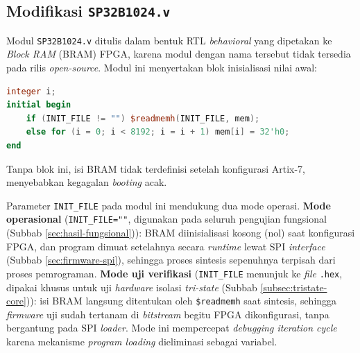 

\subsection{Modifikasi \texttt{SP32B1024.v}}
\label{subsec:sp32b1024}

Modul \texttt{SP32B1024.v} ditulis dalam bentuk RTL \textit{behavioral} yang dipetakan ke \textit{Block RAM} (BRAM) FPGA, karena modul dengan nama tersebut tidak tersedia pada rilis \textit{open-source}. Modul ini menyertakan blok inisialisasi nilai awal:

\begin{lstlisting}[language=Verilog]
integer i;
initial begin
    if (INIT_FILE != "") $readmemh(INIT_FILE, mem);
    else for (i = 0; i < 8192; i = i + 1) mem[i] = 32'h0;
end
\end{lstlisting}

Tanpa blok ini, isi BRAM tidak terdefinisi setelah konfigurasi Artix-7, menyebabkan kegagalan \textit{booting} acak.

Parameter \texttt{INIT\_FILE} pada modul ini mendukung dua mode operasi. \textbf{Mode operasional} (\texttt{INIT\_FILE=""}, digunakan pada seluruh pengujian fungsional (Subbab \ref{sec:hasil-fungsional})): BRAM diinisialisasi kosong (nol) saat konfigurasi FPGA, dan program dimuat setelahnya secara \textit{runtime} lewat SPI \textit{interface} (Subbab \ref{sec:firmware-spi}), sehingga proses sintesis sepenuhnya terpisah dari proses pemrograman. \textbf{Mode uji verifikasi} (\texttt{INIT\_FILE} menunjuk ke \textit{file} \texttt{.hex}, dipakai khusus untuk uji \textit{hardware} isolasi \textit{tri-state} (Subbab \ref{subsec:tristate-core})): isi BRAM langsung ditentukan oleh \texttt{\$readmemh} saat sintesis, sehingga \textit{firmware} uji sudah tertanam di \textit{bitstream} begitu FPGA dikonfigurasi, tanpa bergantung pada SPI \textit{loader}. Mode ini mempercepat \textit{debugging iteration cycle} karena mekanisme \textit{program loading} dieliminasi sebagai variabel.

